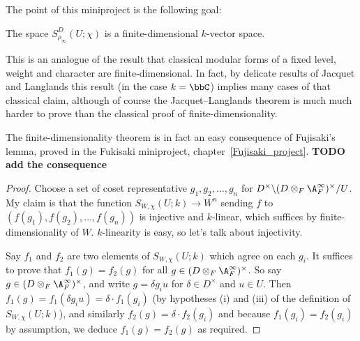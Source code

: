 The point of this miniproject is the following goal:

\begin{theorem}
  \label{TotallyDefiniteQuaternionAlgebra.AutomorphicForm.finiteDimensional}
  The space $S_{\rho_\infty}^D(U;\chi)$ is a finite-dimensional $k$-vector space.
\end{theorem}

This is an analogue of the result that classical modular forms of a fixed
level, weight and character are finite-dimensional. In fact, by delicate results
of Jacquet and Langlands this result (in the case $k=\bbC$) implies many cases of that classical claim,
although of course the Jacquet--Langlands theorem is much much harder to prove than the classical
proof of finite-dimensionality.

The finite-dimensionality theorem is in fact an easy consequence of Fujisaki's lemma,
proved in the Fukisaki miniproject, chapter~\ref{Fujisaki_project}. {\bf TODO add the
consequence}

\begin{proof}
  Choose a set of coset representative $g_1,g_2,\ldots,g_n$ for
  $D^\times\backslash(D\otimes_F\A_F^\infty)^\times/U$. My claim is that
  the function $S_{W,\chi}(U;k)\to W^n$ sending $f$ to $(f(g_1),f(g_2),\ldots,f(g_n))$
  is injective and $k$-linear, which suffices by finite-dimensionality of $W$.
  $k$-linearity is easy, so let's talk about injectivity.

  Say $f_1$ and $f_2$ are two elements of $S_{W,\chi}(U;k)$ which agree on
  each $g_i$. It suffices to prove that $f_1(g)=f_2(g)$ for all
  $g\in(D\otimes_F\A_F^\infty)^\times$. So say $g\in(D\otimes_F\A_F^\infty)^\times$,
  and write $g=\delta g_iu$ for $\delta \in D^\times$ and $u\in U$.
  Then $f_1(g)=f_1(\delta g_iu)=\delta\cdot f_1(g_i)$ (by hypotheses (i) and (iii)
  of the definition of $S_{W,\chi}(U;k)$), and similarly $f_2(g)=\delta\cdot f_2(g_i)$
  and because $f_1(g_i)=f_2(g_i)$ by assumption, we deduce $f_1(g)=f_2(g)$ as required.
\end{proof}
